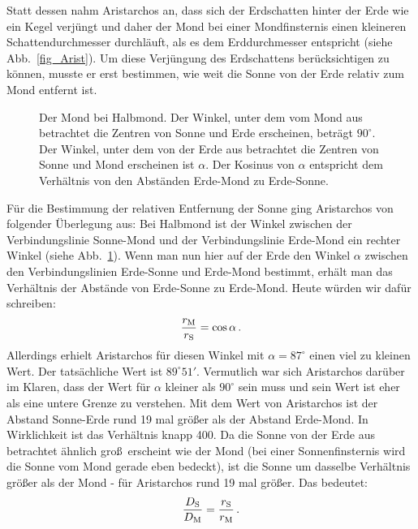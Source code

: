 Statt dessen nahm Aristarchos an, dass sich der Erdschatten hinter der Erde wie ein Kegel
verj\"ungt und daher der Mond bei einer Mondfinsternis einen kleineren Schattendurchmesser 
durchl\"auft, als es dem Erddurchmesser entspricht (siehe Abb.\ \ref{fig_Arist}). Um diese 
Verj\"ungung des Erdschattens ber\"ucksichtigen 
zu k\"onnen, musste er erst bestimmen, wie weit die Sonne von der Erde relativ zum Mond entfernt ist.

\begin{figure}[htb]
\caption{\label{fig_Arist2}%
Der Mond bei Halbmond. Der Winkel, unter dem vom Mond aus betrachtet die Zentren von
Sonne und Erde erscheinen, betr\"agt $90^\circ$. Der Winkel, unter dem von der Erde
aus betrachtet die Zentren von Sonne und Mond erscheinen ist $\alpha$. Der Kosinus von $\alpha$ entspricht 
dem Verh\"altnis von den Abst\"anden Erde-Mond zu Erde-Sonne.}
\end{figure}

F\"ur die Bestimmung der relativen Entfernung der Sonne ging Aristarchos von folgender 
\"Uberlegung aus: Bei Halbmond ist der Winkel zwischen der Verbindungslinie Sonne-Mond
und der Verbindungslinie Erde-Mond ein rechter Winkel (siehe Abb.\ \ref{fig_Arist2}). Wenn man nun hier auf der
Erde den Winkel $\alpha$ zwischen den Verbindungslinien Erde-Sonne und Erde-Mond 
bestimmt, erh\"alt man das Verh\"altnis der Abst\"ande von Erde-Sonne zu Erde-Mond.
Heute w\"urden wir daf\"ur schreiben:
\begin{equation}
\label{eq_Arist1}
                     \frac{r_{\rm M}}{r_{\rm S}} = \cos \alpha \, . 
\end{equation} 
Allerdings erhielt Aristarchos f\"ur diesen Winkel mit $\alpha = 87^\circ$ einen viel zu kleinen Wert.
Der tats\"achliche Wert ist $89^\circ 51'$. Vermutlich war sich Aristarchos dar\"uber im Klaren, dass
der Wert f\"ur $\alpha$ kleiner als $90^\circ$ sein muss und sein Wert ist eher als eine
untere Grenze zu verstehen. 
Mit dem Wert von Aristarchos ist der Abstand Sonne-Erde
rund 19 mal gr\"o\ss er als der Abstand Erde-Mond. In Wirklichkeit ist das Verh\"altnis knapp 400. 
Da die Sonne von der Erde aus betrachtet \"ahnlich gro\ss\ erscheint wie der Mond (bei einer
Sonnenfinsternis wird die Sonne vom Mond gerade eben bedeckt), ist die Sonne um dasselbe
Verh\"altnis gr\"o\ss er als der Mond - f\"ur Aristarchos rund 19 mal gr\"o\ss er. Das bedeutet:
\begin{equation}
\label{eq_Arist2}
                           \frac{D_{\rm S}}{D_{\rm M}} = \frac{r_{\rm S}}{r_{\rm M}} \, .
\end{equation}

